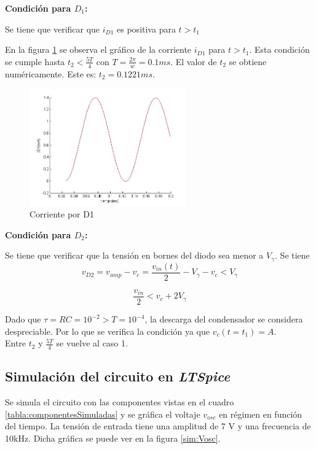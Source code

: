 {\large \bf Condición para $D_1$:}


Se tiene que verificar que $i_{D1}$ es positiva para $t>t_1$

En la figura \ref{fig:id1} se observa el gráfico de la corriente $i_{D1}$ para $t>t_1$. Esta condición se cumple hasta $t_2<\frac{5T}{4}$ con $T = \frac{2\pi}{w} = 0.1ms$. El valor de $t_2$ se obtiene numéricamente. Este es: $t_2 = 0.1221ms$.

\begin{figure}[H]
\centering
\includegraphics[width=0.6\textwidth]{DetectorDePicos/id1.jpg}
\caption{Corriente por D1}
\label{fig:id1}
\end{figure}

{\large \bf Condición para $D_2$:}

Se tiene que verificar que la tensión en bornes del diodo sea menor a $V_\gamma$. Se tiene
\begin{equation*}
	v_{D2} = v_{amp}-v_c = \frac{v_{in}(t)}{2} - V_\gamma -v_c < V_\gamma
\end{equation*}

\begin{equation*}
	\frac{v_{in}}{2} < v_c+2V_\gamma
\end{equation*}

Dado que $\tau = RC = 10^{-2} > T=10^{-4}$, la descarga del condensador se considera despreciable. Por lo que se verifica la condición ya que $v_c(t=t_1) = A$.\\

Entre $t_2$ y $\frac{5T}{4}$ se vuelve al caso 1.


\subsection{Simulación del circuito en \emph{LTSpice}}

Se simula el circuito con las componentes vistas en el cuadro \ref{tabla:componentesSimuladas} y se gráfica el voltaje $v_{osc}$ en régimen en función del tiempo. La tensión de entrada tiene una amplitud de 7 V y una frecuencia de 10kHz. Dicha gráfica se puede ver en la figura \ref{sim:Vosc}. %

